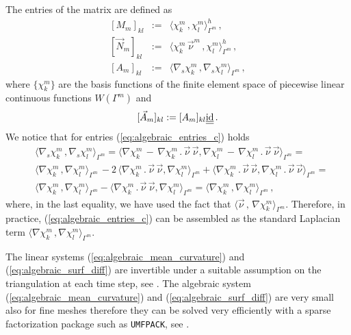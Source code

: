 The entries of the matrix are defined as
\begin{eqnarray}
\left[ M_m \right]_{kl} & := & \langle \chi_k^m \, , \chi_l^m
\rangle_{\Gamma^m}^h\,,\label{eq:algebraic_entries_a} \\
\left[ \vec{N}_m \right]_{kl} & := & \langle \chi_k^m \, \vec{\nu}^m\,,
\chi_l^m \rangle_{\Gamma^m}^h\,,\label{eq:algebraic_entries_b} \\
\left[ A_m \right]_{kl} & := & \langle \nabla_s \chi_k^m \, , \nabla_s
\chi_l^m \rangle_{\Gamma^m}\,,\label{eq:algebraic_entries_c}
\end{eqnarray}
where $\{\chi_k^m\}$ are the basis functions of the finite element space of
piecewise linear continuous functions $W(\Gamma^m)$ and
\begin{equation}\label{eq:algebraic_entries_d}
[\vec{A}_m]_{kl} := [A_m]_{kl} \mat \id\,.
\end{equation}
We notice that for entries (\ref{eq:algebraic_entries_c}) holds
\begin{equation}
\begin{split}
& \langle \nabla_s \chi_k^m \, , \nabla_s \chi_l^m \rangle_{\Gamma^m} = \langle
\nabla \chi_k^m \, -\,\nabla \chi_k^m\,.\,\vec \nu\,\vec\nu, \nabla
\chi_l^m \, -\,\nabla \chi_l^m\,.\,\vec \nu\,\vec\nu\rangle_{\Gamma^m} = \\
& \langle \nabla \chi_k^m \, , \nabla \chi_l^m \rangle_{\Gamma^m}\,
- 2\, \langle \nabla \chi_k^m \,.\,\vec\nu\,\vec\nu , \nabla \chi_l^m
\rangle_{\Gamma^m}
+\langle \nabla \chi_k^m \,.\,\vec\nu\,\vec\nu , \nabla \chi_l^m
\,.\,\vec\nu\,\vec\nu \rangle_{\Gamma^m} = \\
& \langle \nabla \chi_k^m \, , \nabla \chi_l^m \rangle_{\Gamma^m}
- \langle \nabla \chi_k^m \,.\,\vec\nu\,\vec\nu , \nabla \chi_l^m
\rangle_{\Gamma^m} =
\langle \nabla \chi_k^m \, , \nabla \chi_l^m \rangle_{\Gamma^m}\,,
\end{split}
\end{equation}
where, in the last equality, we have used the fact that $\langle \vec
\nu\,,\,\nabla \chi_k^m  \rangle_{\Gamma^m}$. Therefore, in practice,
(\ref{eq:algebraic_entries_c}) can be assembled as the standard Laplacian
term $\langle \nabla \chi_k^m \, , \nabla \chi_l^m \rangle_{\Gamma^m}$.


The linear systems (\ref{eq:algebraic_mean_curvature}) and
(\ref{eq:algebraic_surf_diff}) are invertible under a suitable assumption on the
triangulation at each time step, see \cite{gflows3d}. The algebraic system
(\ref{eq:algebraic_mean_curvature}) and (\ref{eq:algebraic_surf_diff}) are
very small also for fine meshes therefore they can be solved very efficiently
with a sparse factorization package such as \verb|UMFPACK|, see \cite{Davis04}.

